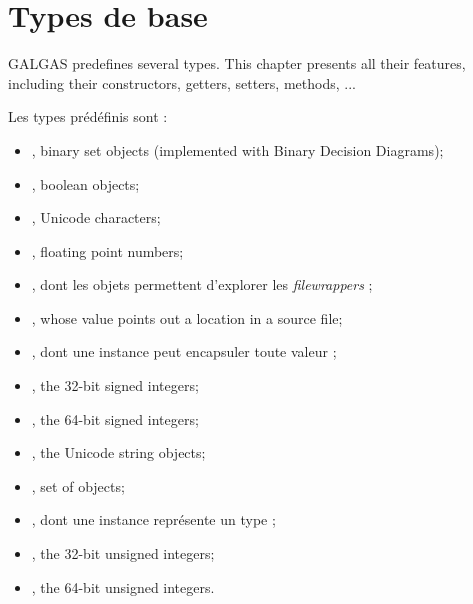 
\chapter{Types de base}\label{predefinedTypes}

GALGAS predefines several types. This chapter presents all their features, including their constructors, getters, setters, methods, ...


Les types prédéfinis sont :
\begin{itemize}
\item {}, binary set objects (implemented with Binary Decision Diagrams);
\item {}, boolean objects;
\item {}, Unicode characters;
\item {}, floating point numbers;
\item {}, dont les objets permettent d'explorer les \emph{filewrappers} ;
\item {}, whose value points out a location in a source file;
\item {}, dont une instance peut encapsuler toute valeur ;
\item {}, the 32-bit signed integers;
\item {}, the 64-bit signed integers;
\item {}, the Unicode string objects;
\item {}, set of  objects;
\item {}, dont une instance représente un type ;
\item {}, the 32-bit unsigned integers;
\item {}, the 64-bit unsigned integers.
\end{itemize}

